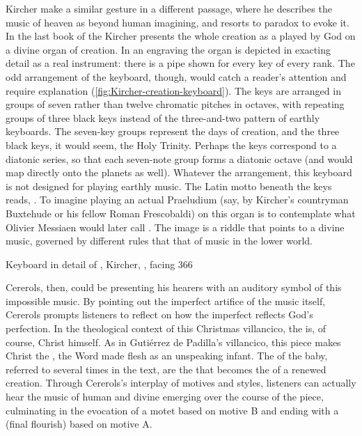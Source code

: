 Kircher make a similar gesture in a different passage, where he describes the
music of heaven as beyond human imagining, and resorts to paradox to evoke it.
In the last book of the  Kircher presents the whole creation as
a  played by God on a divine organ of creation.%
    \Autocite[177]{Godwin:KircherTheater}
In an engraving the organ is depicted in exacting detail as a real instrument:
there is a pipe shown for every key of every rank.%
    \Autocite[bk. 2, facing 366]{Kircher:Musurgia}
The odd arrangement of the keyboard, though, would catch a reader's attention
and require explanation (\cref{fig:Kircher-creation-keyboard}).
The keys are arranged in groups of seven rather than twelve chromatic pitches in
octaves, with repeating groups of three black keys instead of the three-and-two
pattern of earthly keyboards. 
The seven-key groups represent the days of creation, and the three black keys,
it would seem, the Holy Trinity. 
Perhaps the keys correspond to a diatonic series, so that each seven-note group
forms a diatonic octave (and would map directly onto the planets as well).
Whatever the arrangement, this keyboard is not designed for playing earthly
music.
The Latin motto beneath the keys reads, .
To imagine playing an actual Praeludium (say, by Kircher's countryman Buxtehude
or his fellow Roman Frescobaldi) on this organ is to contemplate what Olivier
Messiaen would later call .%
The image is a riddle that points to a divine music, governed by different rules
that that of music in the lower world.

{Keyboard in detail of , Kircher, , facing 366}

Cererols, then, could be presenting his hearers with an auditory symbol of this
impossible music.
By pointing out the imperfect artifice of the music itself, Cererols prompts
listeners to reflect on how the imperfect reflects God's perfection.
In the theological context of this Christmas villancico, the  is, of course, Christ himself.
As in Gutiérrez de Padilla's villancico, this piece makes Christ the
, the Word made flesh as an unspeaking infant.
The  of the baby, referred to several times in the text, are the
 that becomes the  of a renewed creation.
Through Cererols's interplay of motives and styles, listeners can actually hear
the music of human and divine emerging over the course of the piece, culminating
in the evocation of a motet based on motive B and ending with a 
(final flourish) based on motive A.

